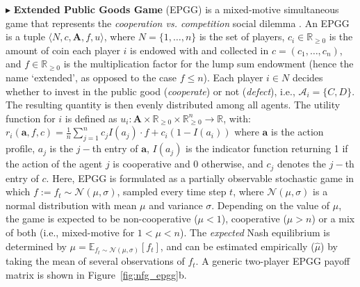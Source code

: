 \documentclass{ecai}
\theoremstyle{plain}
\theoremstyle{definition}
\theoremstyle{remark}
\begin{document}
$\blacktriangleright$ \textbf{Extended Public Goods Game} (EPGG) is a mixed-motive simultaneous game that represents the \textit{cooperation vs. competition} social dilemma \citep{orzanacar}. An EPGG is a tuple $\langle N, c, \mathbf{A}, f, u \rangle$, where $N = \{1, \ldots, n\}$ is the set of players, $c_i \in \mathbb{R}_{\geq 0}$ is the amount of coin each player $i$ is endowed with and collected in $c = (c_1, \ldots,c_n)$, and $f \in \mathbb{R}_{\geq 0}$ is the multiplication factor for the lump sum endowment (hence the name `extended', as opposed to the case $f \leq n$). Each player $i\in N$ decides whether to invest in the public good (\textit{cooperate}) or not (\textit{defect}), i.e., $\mathcal{A}_i = \{C, D\}$. The resulting quantity is then evenly distributed among all agents. The utility function for $i$ is defined as $u_i: \mathbf{A} \times \mathbb{R}_{\geq 0} \times \mathbb{R}_{\geq 0}^{n} 
\rightarrow \mathbb{R}$, with:
 $ r_i(\mathbf{a}, f, c) = \frac{1}{n} \sum_{j=1}^{n} c_j I(a_j) \cdot f + c_i (1 - I(a_i))$
where $\mathbf{a}$ is the action profile, $a_j$ is the $j-$th entry of $\mathbf{a}$, $I(a_j)$ is the indicator function returning 1 if the action of the agent $j$ is cooperative and 0 otherwise, and $c_j$ denotes the $j-$th entry of $c$. Here, EPGG is formulated as a partially observable stochastic game in which $f:=f_t\sim\mathcal{N} ( \mu , \sigma)$, sampled every time step $t$, where $\mathcal{N} ( \mu , \sigma)$ is a normal distribution with mean $\mu$ and variance $\sigma$. Depending on the value of $\mu$, the game is expected to be non-cooperative ($\mu <1$), cooperative ($\mu > n$) or a mix of both (i.e., mixed-motive for $1<\mu<n$). The \textit{expected} Nash equilibrium is determined by $\mu=\mathbb{E}_{f_t\sim\mathcal{N}(\mu,\sigma)}[f_t]$, and can be estimated empirically ($\hat\mu$) by taking the mean of several observations of $f_t$. A generic two-player EPGG payoff matrix is shown in Figure~\ref{fig:nfg_epgg}b.
\end{document}
